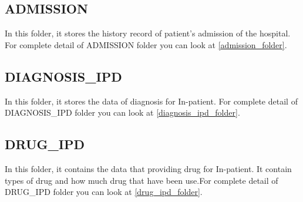     \subsection{ADMISSION}
        In this folder, it stores the history record of patient's admission of the hospital. For complete detail of ADMISSION folder you can look at \ref{admission_folder}.

    \subsection{DIAGNOSIS\_IPD}
        In this folder, it stores the data of diagnosis for In-patient. For complete detail of DIAGNOSIS\_IPD folder you can look at \ref{diagnosis_ipd_folder}.
    
    \subsection{DRUG\_IPD}
        In this folder, it contains the data that providing drug for In-patient. It contain types of drug and how much drug that have been use.For complete detail of DRUG\_IPD folder you can look at \ref{drug_ipd_folder}.
        
